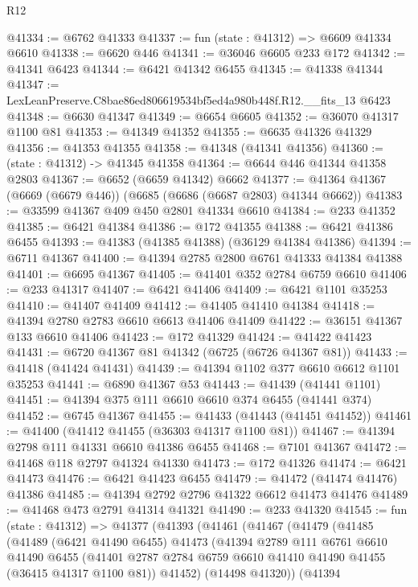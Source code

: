 \begin{lexlean}{R12}
\begin{coremodule}
@41334 := @6762 @41333
@41337 := fun (state : @41312) => @6609 @41334 @6610
@41338 := @6620 @446
@41341 := @36046 @6605 @233 @172
@41342 := @41341 @6423
@41344 := @6421 @41342 @6455
@41345 := @41338 @41344
@41347 := LexLeanPreserve.C8bae86ed806619534bf5ed4a980b448f.R12.__fits_13 @6423
@41348 := @6630 @41347
@41349 := @6654 @6605
@41352 := @36070 @41317 @1100 @81
@41353 := @41349 @41352
@41355 := @6635 @41326 @41329
@41356 := @41353 @41355
@41358 := @41348 (@41341 @41356)
@41360 := (state : @41312) -> @41345 @41358
@41364 := @6644 @446 @41344 @41358 @2803
@41367 := @6652 (@6659 @41342) @6662
@41377 := @41364 @41367 (@6669 (@6679 @446)) (@6685 (@6686 (@6687 @2803) @41344 @6662))
@41383 := @33599 @41367 @409 @450 @2801 @41334 @6610
@41384 := @233 @41352
@41385 := @6421 @41384
@41386 := @172 @41355
@41388 := @6421 @41386 @6455
@41393 := @41383 (@41385 @41388) (@36129 @41384 @41386)
@41394 := @6711 @41367
@41400 := @41394 @2785 @2800 @6761 @41333 @41384 @41388
@41401 := @6695 @41367
@41405 := @41401 @352 @2784 @6759 @6610
@41406 := @233 @41317
@41407 := @6421 @41406
@41409 := @6421 @1101 @35253
@41410 := @41407 @41409
@41412 := @41405 @41410 @41384
@41418 := @41394 @2780 @2783 @6610 @6613 @41406 @41409
@41422 := @36151 @41367 @133 @6610 @41406
@41423 := @172 @41329
@41424 := @41422 @41423
@41431 := @6720 @41367 @81 @41342 (@6725 (@6726 @41367 @81))
@41433 := @41418 (@41424 @41431)
@41439 := @41394 @1102 @377 @6610 @6612 @1101 @35253
@41441 := @6890 @41367 @53
@41443 := @41439 (@41441 @1101)
@41451 := @41394 @375 @111 @6610 @6610 @374 @6455 (@41441 @374)
@41452 := @6745 @41367
@41455 := @41433 (@41443 (@41451 @41452))
@41461 := @41400 (@41412 @41455 (@36303 @41317 @1100 @81))
@41467 := @41394 @2798 @111 @41331 @6610 @41386 @6455
@41468 := @7101 @41367
@41472 := @41468 @118 @2797 @41324 @41330
@41473 := @172 @41326
@41474 := @6421 @41473
@41476 := @6421 @41423 @6455
@41479 := @41472 (@41474 @41476) @41386
@41485 := @41394 @2792 @2796 @41322 @6612 @41473 @41476
@41489 := @41468 @473 @2791 @41314 @41321
@41490 := @233 @41320
@41545 := fun (state : @41312) =>
  @41377
    (@41393
      (@41461
        (@41467
          (@41479
            (@41485
              (@41489
                (@6421 @41490 @6455)
                @41473
                (@41394
                  @2789
                  @111
                  @6761
                  @6610
                  @41490
                  @6455
                  (@41401 @2787 @2784 @6759 @6610 @41410 @41490 @41455 (@36415 @41317 @1100 @81))
                  @41452)
                (@14498 @41320))
              (@41394

\end{coremodule}
\end{lexlean}
